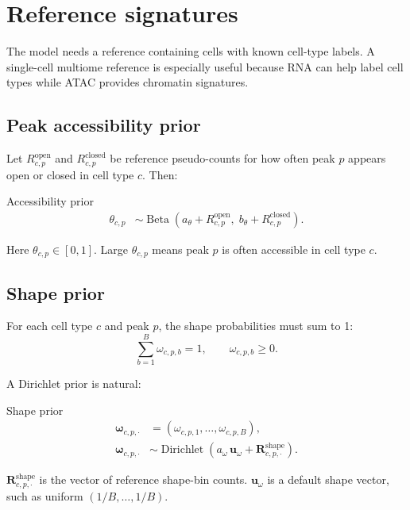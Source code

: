 \documentclass[11pt]{article}
\newcommand{\Dir}{\operatorname{Dirichlet}}
\newcommand{\Betadist}{\operatorname{Beta}}
\begin{document}
\section{Reference signatures}

The model needs a reference containing cells with known cell-type labels.  A single-cell multiome reference is especially useful because RNA can help label cell types while ATAC provides chromatin signatures.

\subsection{Peak accessibility prior}

Let \(R_{c,p}^{\mathrm{open}}\) and \(R_{c,p}^{\mathrm{closed}}\) be reference pseudo-counts for how often peak \(p\) appears open or closed in cell type \(c\).  Then:

\begin{mathbox}{Accessibility prior}
\begin{align}
\theta_{c,p} &\sim \Betadist\left(a_{\theta}+R_{c,p}^{\mathrm{open}},\; b_{\theta}+R_{c,p}^{\mathrm{closed}}\right).
\end{align}
\end{mathbox}

Here \(\theta_{c,p}\in[0,1]\).  Large \(\theta_{c,p}\) means peak \(p\) is often accessible in cell type \(c\).

\subsection{Shape prior}

For each cell type \(c\) and peak \(p\), the shape probabilities must sum to 1:
\[
\sum_{b=1}^{B}\omega_{c,p,b}=1,
\qquad
\omega_{c,p,b}\ge 0.
\]

A Dirichlet prior is natural:

\begin{mathbox}{Shape prior}
\begin{align}
\boldsymbol{\omega}_{c,p,\cdot}
&= (\omega_{c,p,1},\ldots,\omega_{c,p,B}),\\
\boldsymbol{\omega}_{c,p,\cdot}
&\sim \Dir\left(a_{\omega}\,\boldsymbol{u}_{\omega}+\boldsymbol{R}^{\mathrm{shape}}_{c,p,\cdot}\right).
\end{align}
\end{mathbox}

\(\boldsymbol{R}^{\mathrm{shape}}_{c,p,\cdot}\) is the vector of reference shape-bin counts.  \(\boldsymbol{u}_{\omega}\) is a default shape vector, such as uniform \((1/B,\ldots,1/B)\).
\end{document}
